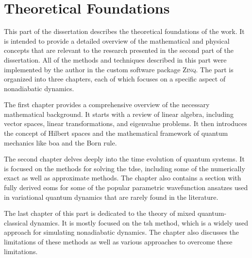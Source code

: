 \part{Theoretical Foundations}
This part of the dissertation describes the theoretical foundations of the work. It is intended to provide a detailed overview of the mathematical and physical concepts that are relevant to the research presented in the second part of the dissertation. All of the methods and techniques described in this part were implemented by the author in the custom software package \textsc{Zinq}.\supercite{10.5281/zenodo.18386143} The part is organized into three chapters, each of which focuses on a specific aspect of nonadiabatic dynamics.

The first chapter provides a comprehensive overview of the necessary mathematical background. It starts with a review of linear algebra, including vector spaces, linear transformations, and eigenvalue problems. It then introduces the concept of Hilbert spaces and the mathematical framework of quantum mechanics like \gls{boa} and the Born rule.

The second chapter delves deeply into the time evolution of quantum systems. It is focused on the methods for solving the \gls{tdse}, including some of the numerically exact as well as approximate methods. The chapter also contains a section with fully derived \glspl{eom} for some of the popular parametric wavefunction ansatzes used in variational quantum dynamics that are rarely found in the literature.

The last chapter of this part is dedicated to the theory of mixed quantum-classical dynamics. It is mostly focused on the \gls{tsh} method, which is a widely used approach for simulating nonadiabatic dynamics. The chapter also discusses the limitations of these methods as well as various approaches to overcome these limitations.



